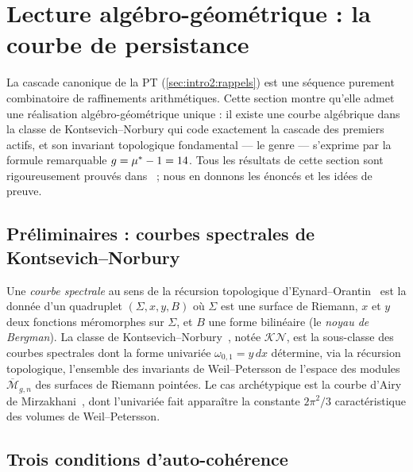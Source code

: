\section{Lecture algébro-géométrique : la courbe de persistance}
\label{sec:courbe}

La cascade canonique de la PT (\ref{sec:intro2:rappels}) est une séquence purement combinatoire de raffinements arithmétiques. Cette section montre qu'elle admet une réalisation algébro-géométrique unique : il existe une courbe algébrique dans la classe de Kontsevich--Norbury qui code exactement la cascade des premiers actifs, et son invariant topologique fondamental --- le genre --- s'exprime par la formule remarquable $g = \mu^{*} - 1 = 14$. Tous les résultats de cette section sont rigoureusement prouvés dans~\cite{PT_GeoFlow_PersistenceCurve} ; nous en donnons les énoncés et les idées de preuve.

\subsection{Préliminaires : courbes spectrales de Kontsevich--Norbury}
\label{sec:courbe:KN}

Une \emph{courbe spectrale} au sens de la récursion topologique d'Eynard--Orantin~\cite{EynardOrantin2007} est la donnée d'un quadruplet $(\Sigma, x, y, B)$ où $\Sigma$ est une surface de Riemann, $x$ et $y$ deux fonctions méromorphes sur $\Sigma$, et $B$ une forme bilinéaire (le \emph{noyau de Bergman}). La classe de Kontsevich--Norbury~\cite{Kontsevich1992,Norbury2017}, notée $\mathcal{KN}$, est la sous-classe des courbes spectrales dont la forme univariée $\omega_{0,1} = y\, dx$ détermine, via la récursion topologique, l'ensemble des invariants de Weil--Petersson de l'espace des modules $\overline{\mathcal M}_{g,n}$ des surfaces de Riemann pointées. Le cas archétypique est la courbe d'Airy de Mirzakhani~\cite{Mirzakhani2007}, dont l'univariée fait apparaître la constante $2\pi^{2}/3$ caractéristique des volumes de Weil--Petersson.

\subsection{Trois conditions d'auto-cohérence}
\label{sec:courbe:conditions}

